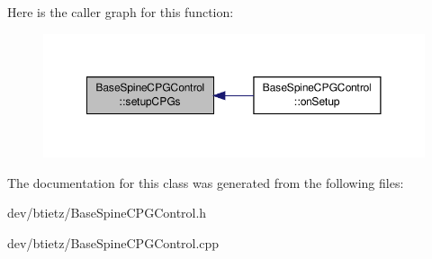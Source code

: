 Here is the caller graph for this function\-:\nopagebreak
\begin{figure}[H]
\begin{center}
\leavevmode
\includegraphics[width=350pt]{class_base_spine_c_p_g_control_a4f54eecdac3f19693752a77a8668f119_icgraph}
\end{center}
\end{figure}




The documentation for this class was generated from the following files\-:\begin{DoxyCompactItemize}
\item 
dev/btietz/Base\-Spine\-C\-P\-G\-Control.\-h\item 
dev/btietz/Base\-Spine\-C\-P\-G\-Control.\-cpp\end{DoxyCompactItemize}
